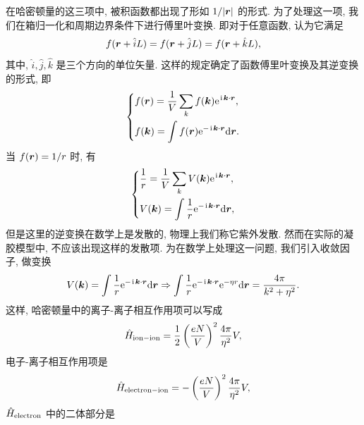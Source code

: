 在哈密顿量的这三项中, 被积函数都出现了形如 $1/|\boldsymbol{r}|$ 的形式. 为了处理这一项, 我们在箱归一化和周期边界条件下进行傅里叶变换. 即对于任意函数, 认为它满足
\begin{equation}
   f(\boldsymbol{r}+\hat iL)=f(\boldsymbol{r}+\hat jL)=f(\boldsymbol{r}+\hat kL), 
\end{equation}
其中, $\hat i, \hat j, \hat k$ 是三个方向的单位矢量. 这样的规定确定了函数傅里叶变换及其逆变换的形式, 即
\begin{equation}
   \left\{
      \begin{aligned}
         &f(\boldsymbol{r})=\frac{1}{V}\sum_{k}f(\boldsymbol{k})\mathrm{e}^{\hspace{0.1em}\mathrm{i}\hspace{0.1em}\boldsymbol{k}\cdot \boldsymbol{r}}, \\
         &f(\boldsymbol{k})=\int f(\boldsymbol{r})\mathrm{e}^{-\hspace{0.1em}\mathrm{i}\hspace{0.1em}\boldsymbol{k}\cdot \boldsymbol{r}}\mathrm{d}\boldsymbol{r}. 
      \end{aligned}
   \right. 
\end{equation}
当 $f(\boldsymbol{r})=1/r$ 时, 有
\begin{equation}
   \left\{
      \begin{aligned}
         &\frac{1}{r}=\frac{1}{V}\sum_{ k}V(\boldsymbol{k})\mathrm{e}^{\hspace{0.1em}\mathrm{i}\hspace{0.1em}\boldsymbol{k}\cdot\boldsymbol{r}}, \\
         &V(\boldsymbol{k})=\int\frac{1}{ r}\mathrm{e}^{-\hspace{0.1em}\mathrm{i}\hspace{0.1em}\boldsymbol{k}\cdot\boldsymbol{r}}\mathrm{d}\boldsymbol{r}, 
      \end{aligned}
   \right. 
\end{equation}
但是这里的逆变换在数学上是发散的, 物理上我们称它紫外发散. 然而在实际的凝胶模型中, 不应该出现这样的发散项. 为在数学上处理这一问题, 我们引入收敛因子, 做变换
\begin{equation}\label{shoulianyinzi}
   V(\boldsymbol{k})=\int\frac{1}{r}\mathrm{e}^{-\hspace{0.1em}\mathrm{i}\hspace{0.1em}\boldsymbol{k}\cdot \boldsymbol{r}}\mathrm{d}\boldsymbol{r}\Rightarrow \int\frac{1}{r}\mathrm{e}^{-\hspace{0.1em}\mathrm{i}\hspace{0.1em}\boldsymbol{k}\cdot\boldsymbol{r}}\mathrm{e}^{-\eta r}\mathrm{d}\boldsymbol{r}=\frac{4\pi}{k^2+\eta^2}. 
\end{equation}
这样, 哈密顿量中的离子-离子相互作用项可以写成
\begin{equation}
   \hat H_{\mathrm{ion-ion}}=\frac{1}{2}\left( \frac{eN}{V} \right)^2\frac{4\pi}{\eta^2}V, 
\end{equation}
电子-离子相互作用项是
\begin{equation}
   \hat H_{\mathrm{electron-ion}}=-\left( \frac{eN}{V} \right)^2\frac{4\pi}{\eta^2}V, 
\end{equation}
$\hat H_{\mathrm{electron}}$ 中的二体部分是
